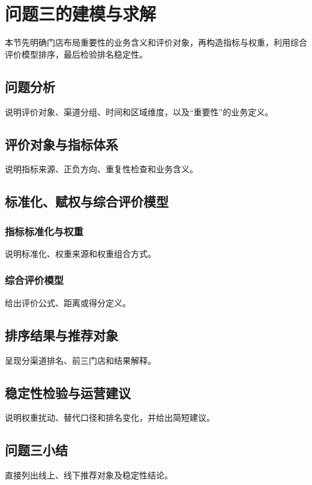 \section{问题三的建模与求解}

本节先明确门店布局重要性的业务含义和评价对象，再构造指标与权重，利用综合评价模型排序，最后检验排名稳定性。

\subsection{问题分析}
说明评价对象、渠道分组、时间和区域维度，以及“重要性”的业务定义。

\subsection{评价对象与指标体系}
说明指标来源、正负方向、重复性检查和业务含义。

\subsection{标准化、赋权与综合评价模型}
\subsubsection{指标标准化与权重}
说明标准化、权重来源和权重组合方式。

\subsubsection{综合评价模型}
给出评价公式、距离或得分定义。

\subsection{排序结果与推荐对象}
呈现分渠道排名、前三门店和结果解释。

\subsection{稳定性检验与运营建议}
说明权重扰动、替代口径和排名变化，并给出简短建议。

\subsection{问题三小结}
直接列出线上、线下推荐对象及稳定性结论。
